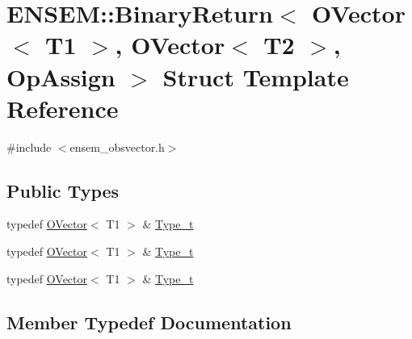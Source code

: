 \hypertarget{structENSEM_1_1BinaryReturn_3_01OVector_3_01T1_01_4_00_01OVector_3_01T2_01_4_00_01OpAssign_01_4}{}\section{E\+N\+S\+EM\+:\+:Binary\+Return$<$ O\+Vector$<$ T1 $>$, O\+Vector$<$ T2 $>$, Op\+Assign $>$ Struct Template Reference}
\label{structENSEM_1_1BinaryReturn_3_01OVector_3_01T1_01_4_00_01OVector_3_01T2_01_4_00_01OpAssign_01_4}


{\ttfamily \#include $<$ensem\+\_\+obsvector.\+h$>$}

\subsection*{Public Types}
\begin{DoxyCompactItemize}
\item 
typedef \mbox{\hyperlink{classENSEM_1_1OVector}{O\+Vector}}$<$ T1 $>$ \& \mbox{\hyperlink{structENSEM_1_1BinaryReturn_3_01OVector_3_01T1_01_4_00_01OVector_3_01T2_01_4_00_01OpAssign_01_4_ab2b693bbb295f9694204d3198d251aeb}{Type\+\_\+t}}
\item 
typedef \mbox{\hyperlink{classENSEM_1_1OVector}{O\+Vector}}$<$ T1 $>$ \& \mbox{\hyperlink{structENSEM_1_1BinaryReturn_3_01OVector_3_01T1_01_4_00_01OVector_3_01T2_01_4_00_01OpAssign_01_4_ab2b693bbb295f9694204d3198d251aeb}{Type\+\_\+t}}
\item 
typedef \mbox{\hyperlink{classENSEM_1_1OVector}{O\+Vector}}$<$ T1 $>$ \& \mbox{\hyperlink{structENSEM_1_1BinaryReturn_3_01OVector_3_01T1_01_4_00_01OVector_3_01T2_01_4_00_01OpAssign_01_4_ab2b693bbb295f9694204d3198d251aeb}{Type\+\_\+t}}
\end{DoxyCompactItemize}


\subsection{Member Typedef Documentation}
\mbox{\label{structENSEM_1_1BinaryReturn_3_01OVector_3_01T1_01_4_00_01OVector_3_01T2_01_4_00_01OpAssign_01_4_ab2b693bbb295f9694204d3198d251aeb}} 

